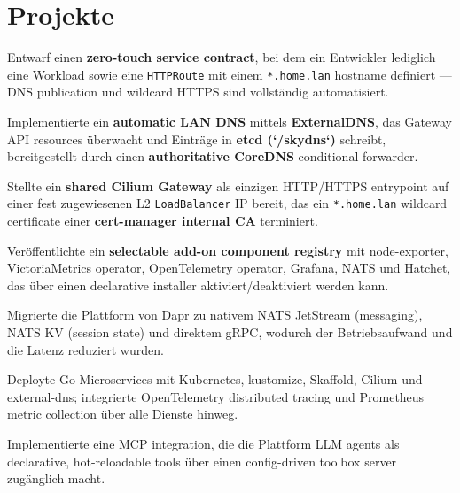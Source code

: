 \documentclass[10pt,a4paper]{resume}
\begin{document}
\vspace{2pt}

\section{Projekte}

\bullets
  \item Entwarf einen \textbf{zero-touch service contract}, bei dem ein Entwickler lediglich eine Workload sowie eine \texttt{HTTPRoute} mit einem \texttt{*.home.lan} hostname definiert — DNS publication und wildcard HTTPS sind vollständig automatisiert.
  \item Implementierte ein \textbf{automatic LAN DNS} mittels \textbf{ExternalDNS}, das Gateway API resources überwacht und Einträge in \textbf{etcd (`/skydns`)} schreibt, bereitgestellt durch einen \textbf{authoritative CoreDNS} conditional forwarder.
  \item Stellte ein \textbf{shared Cilium Gateway} als einzigen HTTP/HTTPS entrypoint auf einer fest zugewiesenen L2 \texttt{LoadBalancer} IP bereit, das ein \texttt{*.home.lan} wildcard certificate einer \textbf{cert-manager internal CA} terminiert.
  \item Veröffentlichte ein \textbf{selectable add-on component registry} mit node-exporter, VictoriaMetrics operator, OpenTelemetry operator, Grafana, NATS und Hatchet, das über einen declarative installer aktiviert/deaktiviert werden kann.
\bulletsend
\vspace{1.0pt}
\bullets
  \item Migrierte die Plattform von Dapr zu nativem NATS JetStream (messaging), NATS KV (session state) und direktem gRPC, wodurch der Betriebsaufwand und die Latenz reduziert wurden.
  \item Deployte Go-Microservices mit Kubernetes, kustomize, Skaffold, Cilium und external-dns; integrierte OpenTelemetry distributed tracing und Prometheus metric collection über alle Dienste hinweg.
  \item Implementierte eine MCP integration, die die Plattform LLM agents als declarative, hot-reloadable tools über einen config-driven toolbox server zugänglich macht.
\bulletsend
\end{document}
